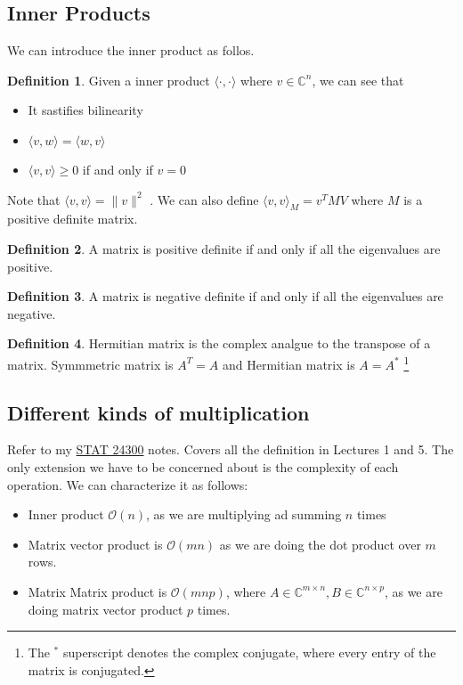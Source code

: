 \documentclass[11pt]{article}
\theoremstyle{definition}
\newtheorem{definition}{Definition}[section]
\newcommand{\C}{\mathbb{C}}
\newcommand{\bigO}[1]{\mathcal{O}\left(#1\right)}
\begin{document}
\subsection{Inner Products}
We can introduce the inner product as follos. 
\begin{definition}
  Given a inner product $\langle \cdot , \cdot \rangle $ where $v \in \C^n$, we can see that 
  \begin{itemize}
    \item It sastifies bilinearity 
    \item $\langle v, w \rangle = \langle w , v \rangle$
    \item $\langle v, v \rangle \geq 0$ if and only if $v = 0$
  \end{itemize}
  Note that $\langle v, v \rangle = \| v \|^2$ . We can also define $\langle v, v \rangle_M = v^T M V$ where $M$ is a positive definite matrix.
\end{definition}
\begin{definition}
  A matrix is positive definite if and only if all the eigenvalues are positive. 
\end{definition}
\begin{definition}
  A matrix is negative definite if and only if all the eigenvalues are negative. 
\end{definition}
\begin{definition}
  Hermitian matrix is the complex analgue to the transpose of a matrix. Symmmetric matrix is $A^T = A$ and Hermitian matrix is $A = A^*$ \footnote{The ${}^*$ superscript denotes the complex conjugate, where every entry of the matrix is conjugated.}
\end{definition}
\subsection{Different kinds of multiplication}
Refer to my \href{https://github.com/anthonykyoon/notes-latex/blob/main/notes/STAT24300.pdf}{STAT 24300} notes. Covers all the definition in Lectures 1 and 5. The only extension we have to be concerned about is the complexity of each operation. We can characterize it as follows:
\begin{itemize}
  \item Inner product $\bigO{n}$, as we are multiplying ad summing $n$ times
  \item Matrix vector product is $\bigO{mn}$ as we are doing the dot product over $m$ rows. 
  \item Matrix Matrix product is $\bigO{mnp}$, where $A \in \C^{m \times n}, B \in \C^{n \times p}$, as we are doing matrix vector product $p$ times. 
\end{itemize}
\end{document}
